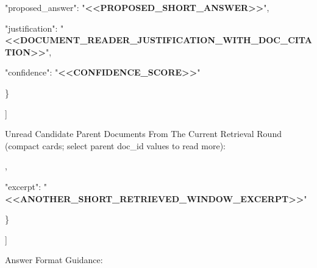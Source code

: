 \begin{tcolorbox}[colback=white, colframe=my-green, coltitle=black, parskip=5mm, title=\textbf{Hop Resolve}, halign=flush left, enhanced, breakable, skin first=enhanced, skin middle=enhanced, skin last=enhanced]
\begin{scriptsize}
    "proposed\_answer": "\textcolor{my-green}{\textbf{\textless{}\textless{}PROPOSED\_SHORT\_ANSWER\textgreater{}\textgreater{}}}",\par
    "justification": "\textcolor{my-green}{\textbf{\textless{}\textless{}DOCUMENT\_READER\_JUSTIFICATION\_WITH\_DOC\_CITATION\textgreater{}\textgreater{}}}",\par
    "confidence": "\textcolor{my-green}{\textbf{\textless{}\textless{}CONFIDENCE\_SCORE\textgreater{}\textgreater{}}}"\par
  \}\par
]\par
\mbox{}\par
Unread Candidate Parent Documents From The Current Retrieval Round (compact cards; select parent doc\_id values to read more):\par
[\par
  \{\par
    "doc\_id": "\textcolor{my-green}{\textbf{\textless{}\textless{}SECOND\_CANDIDATE\_PARENT\_DOC\_ID\textgreater{}\textgreater{}}}",\par
    "source": "\textcolor{my-green}{\textbf{\textless{}\textless{}LOCAL\_OR\_WEB\textgreater{}\textgreater{}}}",\par
    "title": "\textcolor{my-green}{\textbf{\textless{}\textless{}SECOND\_CANDIDATE\_DOCUMENT\_TITLE\textgreater{}\textgreater{}}}",\par
    "matched\_window\_count": "\textcolor{my-green}{\textbf{\textless{}\textless{}N\_MATCHED\_WINDOWS\textgreater{}\textgreater{}}}",\par
    "total\_window\_count": "\textcolor{my-green}{\textbf{\textless{}\textless{}N\_TOTAL\_WINDOWS\textgreater{}\textgreater{}}}",\par
    "best\_rank": "\textcolor{my-green}{\textbf{\textless{}\textless{}BEST\_RETRIEVAL\_RANK\textgreater{}\textgreater{}}}",\par
    "top\_queries": [\par
      "\textcolor{my-green}{\textbf{\textless{}\textless{}ANOTHER\_RETRIEVAL\_QUERY\textgreater{}\textgreater{}}}"\par
    ],\par
    "excerpt": "\textcolor{my-green}{\textbf{\textless{}\textless{}ANOTHER\_SHORT\_RETRIEVED\_WINDOW\_EXCERPT\textgreater{}\textgreater{}}}"\par
  \}\par
]\par
\mbox{}\par
Answer Format Guidance:\par

\end{scriptsize}
\end{tcolorbox}
